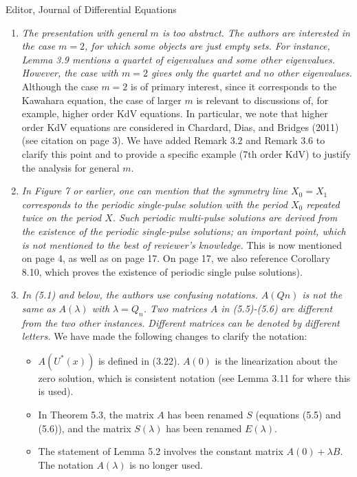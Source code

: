 \documentclass[11pt]{letter}
\begin{document}
\begin{letter}{Editor, Journal of Differential Equations}
\begin{enumerate}
    \item \emph{The presentation with general $m$ is too abstract. The authors are interested in the case $m = 2$, for which some objects are just empty sets. For instance, Lemma 3.9 mentions a quartet of eigenvalues and some other eigenvalues. However, the case with $m = 2$ gives only the quartet and no other eigenvalues.} Although the case $m=2$ is of primary interest, since it corresponds to the Kawahara equation, the case of larger $m$ is relevant to discussions of, for example, higher order KdV equations. In particular, we note that higher order KdV equations are considered in Chardard, Dias, and Bridges (2011) (see citation on page 3). We have added Remark 3.2 and Remark 3.6 to clarify this point and to provide a specific example (7th order KdV) to justify the analysis for general $m$. 
    \vspace{4mm}

    \item \emph{In Figure 7 or earlier, one can mention that the symmetry line $X_0 = X_1$ corresponds to the periodic single-pulse solution with the period $X_0$ repeated twice on the period $X$. Such periodic multi-pulse solutions are derived from the existence of the periodic single-pulse solutions; an important point, which is not mentioned to the best of reviewer's knowledge.} This is now mentioned on page 4, as well as on page 17. On page 17, we also reference Corollary 8.10, which proves the existence of periodic single pulse solutions).
    \vspace{4mm}

    \item \emph{In (5.1) and below, the authors use confusing notations. $A(Qn)$ is not the same as $A(\lambda)$ with $\lambda = Q_n$. Two matrices $A$ in (5.5)-(5.6) are different from the two other instances. Different matrices can be denoted by different letters.} We have made the following changes to clarify the notation:
    \begin{itemize}
        \item $A(U^*(x))$ is defined in (3.22). $A(0)$ is the linearization about the zero solution, which is consistent notation (see Lemma 3.11 for where this is used).
        \item In Theorem 5.3, the matrix $A$ has been renamed $S$ (equations (5.5) and (5.6)), and the matrix $S(\lambda)$ has been renamed $E(\lambda)$.
        \item The statement of Lemma 5.2 involves the constant matrix $A(0)+\lambda B$. The notation $A(\lambda)$ is no longer used.
    \end{itemize}
    \vspace{4mm}


\end{enumerate}
\end{letter}
\end{document}
